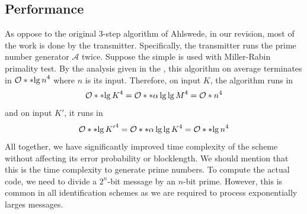 \subsection{Performance}
As oppose to the original 3-step algorithm of Ahlswede, in our revision, most of the work is done by the transmitter. Specifically, the transmitter runs the prime number generator \(\mathcal{A}\) twice. Suppose the simple  is used with Miller-Rabin primality test. By the analysis given in the , this algorithm on average terminates in \(\bigO{\bracket{\lg n}^4}\) where \(n\) is its input. Therefore, on input \(K\), the algorithm runs in 
\begin{equation*}
    \bigO{\bracket{\lg K}^4} = \bigO{\bracket{\alpha \lg \lg M }^4} = \bigO{n^4}
\end{equation*}
and on input \(K'\), it runs in 
\begin{equation*}
    \bigO{\bracket{\lg K'}^4} = \bigO{\bracket{\alpha \lg \lg K }^4} = \bigO{\bracket{\lg n}^4}
\end{equation*}
All together, we have significantly improved time complexity of the scheme without affecting its error probability or blocklength. We should mention that this is the time complexity to generate prime numbers. To compute the actual code, we need to divide a \(2^n\)-bit message by an \(n\)-bit prime. However, this is common in all identification schemes as we are required to process exponentially larges messages. 
